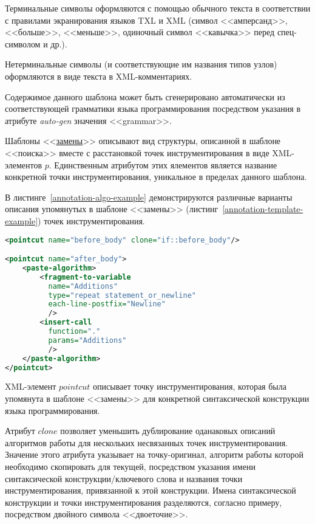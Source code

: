 Терминальные символы оформляются с помощью обычного текста в соответствии с правилами экранирования языков TXL и XML (символ <<амперсанд>>, <<больше>>, <<меньше>>, одиночный символ <<кавычка>> перед спец-символом и др.).

Нетерминальные символы (и соответствующие им названия типов узлов) оформляются в виде текста в XML-комментариях.

Содержимое данного шаблона может быть сгенерировано автоматически из соответствующей грамматики языка программирования посредством указания в атрибуте \textit{auto-gen} значения <<grammar>>.

Шаблоны <<\underline{замены}>> описывают вид структуры, описанной в шаблоне <<поиска>> вместе с расстановкой точек инструментирования в виде XML-элементов $p$.
Единственным атрибутом этих ялементов является название конкретной точки инструментирования, уникальное в пределах данного шаблона.

В листинге~\ref{annotation-algo-example} демонстрируются различные варианты описания упомянутых в шаблоне <<замены>> (листинг~\ref{annotation-template-example}) точек инструментирования.

\begin{lstlisting}[frame=single, language=XML, label={annotation-algo-example}, caption={Пример}]
<pointcut name="before_body" clone="if::before_body"/>

<pointcut name="after_body">
    <paste-algorithm>
        <fragment-to-variable
          name="Additions"
          type="repeat statement_or_newline"
          each-line-postfix="Newline"
          />
        <insert-call
          function="."
          params="Additions"
          />
    </paste-algorithm>
</pointcut>
\end{lstlisting}

XML-элемент $pointcut$ описывает точку инструментирования, которая была упомянута в шаблоне <<замены>> для конкретной синтаксической конструкции языка программирования.

Атрибут $clone$ позволяет уменьшить дублирование оданаковых описаний алгоритмов работы для нескольких несвязанных точек инструментирования.
Значение этого атрибута указывает на точку-оригинал, алгоритм работы которой необходимо скопировать для текущей, посредством указания имени синтаксической конструкции/ключевого слова и названия точки инструментирования, привязанной к этой конструкции.
Имена синтаксической конструкции и точки инструментирования разделяются, согласно примеру, посредством двойного символа <<двоеточие>>.

